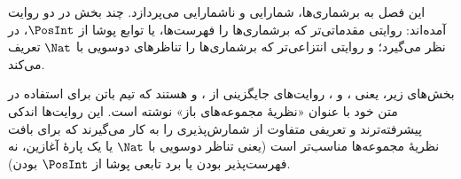 \documentclass[../../../include/open-logic-chapter]{subfiles}
\begin{document}

\begin{editorial}
این فصل به برشماری‌ها، شمارایی و ناشمارایی می‌پردازد. چند بخش در دو
روایت آمده‌اند: روایتی مقدماتی‌تر که برشماری‌ها را فهرست‌ها، یا توابع
پوشا از $\PosInt$، در نظر می‌گیرد؛ و روایتی انتزاعی‌تر که برشماری‌ها را
تناظرهای دوسویی با $\Nat$ تعریف می‌کند.
\end{editorial}











\begin{editorial}
بخش‌های زیر، یعنی ،
 و ،
روایت‌های جایگزینی از ،
 و  هستند که تیم
باتن برای استفاده در متن خود با عنوان «نظریهٔ مجموعه‌های باز» نوشته
است. این روایت‌ها اندکی پیشرفته‌ترند و تعریفی متفاوت از
شمارش‌پذیری را به کار می‌گیرند که برای بافت نظریهٔ مجموعه‌ها مناسب‌تر
است (یعنی تناظر دوسویی با $\Nat$ یا یک پارهٔ آغازین، نه
فهرست‌پذیر بودن یا برد تابعی پوشا از $\PosInt$ بودن).
\end{editorial}


\OLEndChapterHook
\end{document}
